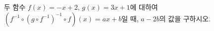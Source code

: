 두 함수 $f(x)=-x+2$, $g(x)=3x+1$에 대하여 $(f^{-1}\circ(g\circ f^{-1})^{-1}\circ f)(x)=ax+b$일 때, $a-2b$의 값을 구하시오. 
